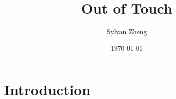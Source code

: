 \documentclass[12pt]{article}
\begin{document}
\title{Out of Touch}
\author{Sylvan Zheng}
\date{\today}

\maketitle

\begin{abstract}

\end{abstract}
\section{Introduction}
\end{document}

